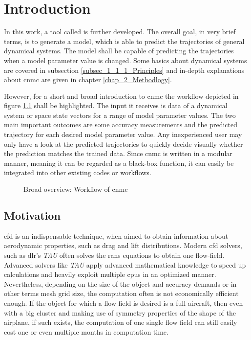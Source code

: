 

\chapter{Introduction}
\label{chap_1_Intro}
In this work, a tool called  is further developed.
The overall goal, in very brief terms, is to generate a model, which is able to 
predict the trajectories of general dynamical systems. The model
shall be capable of predicting the trajectories when a model parameter
value is changed. 
Some basics about dynamical systems are covered in 
subsection \ref{subsec_1_1_1_Principles} and in-depth explanations about \gls{cnmc} are given in
chapter \ref{chap_2_Methodlogy}.\newline 

However, for a short and broad introduction to \gls{cnmc} the workflow depicted in figure \ref{fig_1_CNMC_Workflow} shall be highlighted. 
The input it receives is data of a dynamical system or space state vectors for a range of model parameter values. The two main important outcomes are some accuracy measurements and the predicted trajectory for each desired model parameter value.
Any inexperienced user may only have a look at the predicted trajectories to 
quickly decide visually whether the prediction matches the trained data. Since \gls{cnmc} is written in a modular manner, meaning it can be regarded as 
a black-box function, it can easily be integrated into other existing codes or 
workflows. \newline

\begin{figure}[!h]
  \def\svgwidth{\linewidth}
  
  \caption{Broad overview: Workflow of \gls{cnmc}}
  \label{fig_1_CNMC_Workflow}
\end{figure}

\section{Motivation}
\label{sec_Motivation}
\gls{cfd} is an 
indispensable technique, when aimed to obtain information about aerodynamic properties, such 
as drag and lift distributions. Modern \gls{cfd} solvers, such as \gls{dlr}'s \emph{TAU}
\cite{Langer2014} often solves 
the \gls{rans} equations to obtain one flow-field. Advanced solvers like \emph{TAU} apply advanced 
mathematical knowledge to speed up calculations and
heavily exploit multiple \glspl{cpu} in an optimized manner. Nevertheless,
depending on the size of the object and accuracy demands or in other terms mesh grid size, the computation often is not economically 
efficient enough. If the object for which a flow field is desired is a full aircraft, then even with a big cluster and making use of symmetry properties of the shape of the airplane, if such exists, the computation of one single
flow field can still easily cost one or even multiple months in computation time. \newline 

